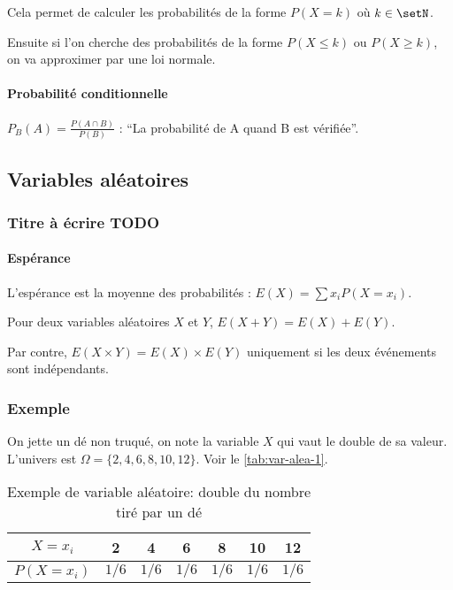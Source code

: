 \documentclass[10pt,a4paper,french]{article}
\begin{document}
Cela permet de calculer les probabilités de la forme $P(X = k)$ où $k \in \setN$.

Ensuite si l'on cherche des probabilités de la forme $P(X \leq k)$ ou $P(X \geq k)$, on va approximer par une loi normale.

\hrulefill

\paragraph{Probabilité conditionnelle}
$P_B(A)=\frac{P(A \cap B)}{P(B)}$ : ``La probabilité de A quand B est vérifiée''.

\subsection{Variables aléatoires}

\subsubsection{Titre à écrire TODO}

\paragraph{Espérance}

L'espérance est la moyenne des probabilités : $E(X) = \sum x_i P(X=x_i)$.

Pour deux variables aléatoires $X$ et $Y$, $E(X+Y) = E(X) + E(Y)$.

Par contre, $E(X \times Y) = E(X) \times E(Y)$ uniquement si les deux événements sont indépendants.

\subsubsection{Exemple}

On jette un dé non truqué, on note la variable $X$ qui vaut le double de sa valeur. L'univers est $\Omega=\lbrace 2, 4, 6, 8, 10, 12 \rbrace$. Voir le \autoref{tab:var-alea-1}.

\begin{table}
\caption{\label{tab:var-alea-1} Exemple de variable aléatoire: double du nombre tiré par un dé}
\centering
\begin{tabular}{c|cccccc}
$X=x_i$ & 2 & 4 & 6 & 8 & 10 & 12\\
\hline
$P(X=x_i)$ & $1/6$ & $1/6$ & $1/6$ & $1/6$ & $1/6$ & $1/6$\\
\end{tabular}
\end{table}
\end{document}

